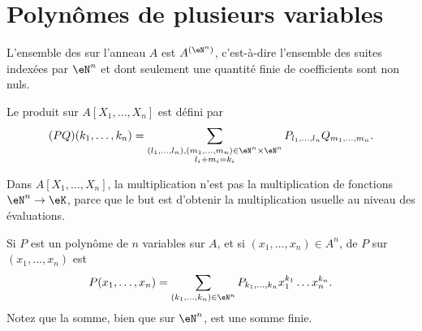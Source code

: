 \section{Polynômes de plusieurs variables}

\begin{definition}      \label{DEFooZNHOooCruuwI}
    L'ensemble des  sur l'anneau \( A\) est \( A^{(\eN^n)}\), c'est-à-dire l'ensemble des suites indexées par \( \eN^n\) et dont seulement une quantité finie de coefficients sont non nuls.

    Le produit sur \( A[X_1,\ldots, X_n]\) est défini par
    \begin{equation}
        (PQ)(k_1,\ldots, k_n)=\sum_{\substack{ (l_1,\ldots, l_n),(m_1,\ldots, m_n)\in \eN^n\times \eN^n   \\l_i+m_i=k_i}}P_{l_1,\ldots, l_n}Q_{m_1,\ldots, m_n}.
        \end{equation}
\end{definition}

\begin{normaltext}
    Dans \( A[X_1,\ldots, X_n]\), la multiplication n'est pas la multiplication de fonctions \( \eN^n\to \eK\), parce que le but est d'obtenir la multiplication usuelle au niveau des évaluations.
\end{normaltext}

\begin{definition}
    Si \( P\) est un polynôme de \( n\) variables sur \( A\), et si \( (x_1,\ldots, x_n)\in A^n\),  de \( P\) sur \( (x_1,\ldots, x_n)\) est
    \begin{equation}
        P(x_1,\ldots, x_n)=\sum_{(k_1,\ldots, k_n)\in \eN^n}P_{k_1,\ldots, k_n}x_1^{k_1}\ldots x_n^{k_n}.
    \end{equation}
    Notez que la somme, bien que sur \( \eN^n\), est une somme finie.
\end{definition}


